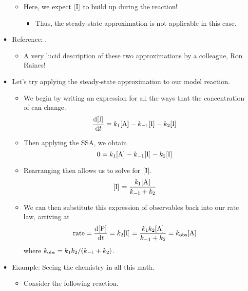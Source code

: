 \documentclass[../notes.tex]{subfiles}
\begin{document}
\begin{itemize}
\begin{itemize}
        \item Here, we expect $\cnc{I}$ to build up during the reaction!
        \begin{itemize}
            \item Thus, the steady-state approximation is not applicable in this case. 
        \end{itemize}
    \end{itemize}
    \item Reference: \textcite{bib:SsaQea}.
    \begin{itemize}
        \item A very lucid description of these two approximations by a colleague, Ron Raines!
    \end{itemize}
    \item Let's try applying the steady-state approximation to our model reaction.
    \begin{itemize}
        \item We begin by writing an expression for all the ways that the concentration of  can change.
        \begin{equation*}
            \dv{\cnc{I}}{t} = k_1\cnc{A}-k_{-1}\cnc{I}-k_2\cnc{I}
        \end{equation*}
        \item Then applying the SSA, we obtain
        \begin{equation*}
            0 = k_1\cnc{A}-k_{-1}\cnc{I}-k_2\cnc{I}
        \end{equation*}
        \item Rearranging then allows us to solve for $\cnc{I}$.
        \begin{equation*}
            \cnc{I} = \frac{k_1\cnc{A}}{k_{-1}+k_2}
        \end{equation*}
        \item We can then substitute this expression of observables back into our rate law, arriving at
        \begin{equation*}
            \rate = \dv{\cnc{P}}{t}
            = k_2\cnc{I}
            = \frac{k_1k_2\cnc{A}}{k_{-1}+k_2}
            = \kobs\cnc{A}
        \end{equation*}
        where $k_\textup{obs}=k_1k_2/(k_{-1}+k_2)$.
    \end{itemize}
    \item Example: Seeing the chemistry in all this math.
    \begin{itemize}
        \item Consider the following reaction.

\end{itemize}
\end{itemize}
\end{document}
